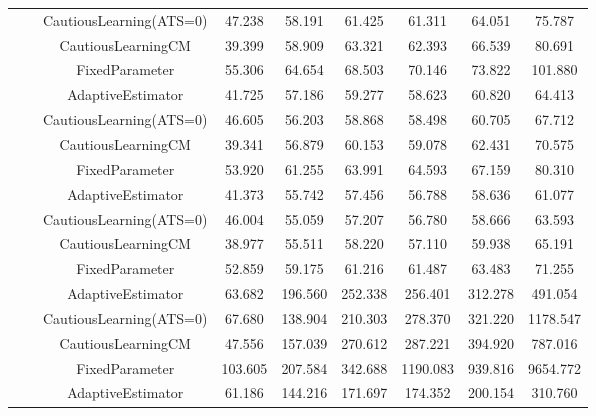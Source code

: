 \begin{table}[!h]
\begin{tabular}[t]{ccccccccc}
 &  & CautiousLearning(ATS=0) & 47.238 & 58.191 & 61.425 & 61.311 & 64.051 & 75.787\\

 &  & CautiousLearningCM & 39.399 & 58.909 & 63.321 & 62.393 & 66.539 & 80.691\\

 & \multirow[t]{-4}{*}{\centering\arraybackslash 1.00} & FixedParameter & 55.306 & 64.654 & 68.503 & 70.146 & 73.822 & 101.880\\
\cmidrule{2-9}
 &  & AdaptiveEstimator & 41.725 & 57.186 & 59.277 & 58.623 & 60.820 & 64.413\\

 &  & CautiousLearning(ATS=0) & 46.605 & 56.203 & 58.868 & 58.498 & 60.705 & 67.712\\

 &  & CautiousLearningCM & 39.341 & 56.879 & 60.153 & 59.078 & 62.431 & 70.575\\

 & \multirow[t]{-4}{*}{\centering\arraybackslash 1.25} & FixedParameter & 53.920 & 61.255 & 63.991 & 64.593 & 67.159 & 80.310\\
\cmidrule{2-9}
 &  & AdaptiveEstimator & 41.373 & 55.742 & 57.456 & 56.788 & 58.636 & 61.077\\

 &  & CautiousLearning(ATS=0) & 46.004 & 55.059 & 57.207 & 56.780 & 58.666 & 63.593\\

 &  & CautiousLearningCM & 38.977 & 55.511 & 58.220 & 57.110 & 59.938 & 65.191\\

\multirow[t]{-28}{*}{\centering\arraybackslash 50} & \multirow[t]{-4}{*}{\centering\arraybackslash 1.50} & FixedParameter & 52.859 & 59.175 & 61.216 & 61.487 & 63.483 & 71.255\\
\cmidrule{1-9}
 &  & AdaptiveEstimator & 63.682 & 196.560 & 252.338 & 256.401 & 312.278 & 491.054\\

 &  & CautiousLearning(ATS=0) & 67.680 & 138.904 & 210.303 & 278.370 & 321.220 & 1178.547\\

 &  & CautiousLearningCM & 47.556 & 157.039 & 270.612 & 287.221 & 394.920 & 787.016\\

 & \multirow[t]{-4}{*}{\centering\arraybackslash 0.25} & FixedParameter & 103.605 & 207.584 & 342.688 & 1190.083 & 939.816 & 9654.772\\
\cmidrule{2-9}
 &  & AdaptiveEstimator & 61.186 & 144.216 & 171.697 & 174.352 & 200.154 & 310.760\\


\end{tabular}
\end{table}
